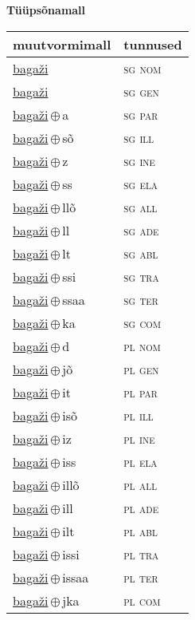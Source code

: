 

\vspace{3.5em}
\noindent \begin{minipage}{\textwidth}
\noindent \textbf{Tüüpsõnamall \,}\\

\begin{sideways}
\begin{tabular}{l l}
muutvormimall & tunnused \\
\hline
\underline{bagaži} & \textsc{ sg nom } \\
\underline{bagaži} & \textsc{ sg gen } \\
\underline{bagaži}\,$\oplus$\,a & \textsc{ sg par } \\
\underline{bagaži}\,$\oplus$\,sõ & \textsc{ sg ill } \\
\underline{bagaži}\,$\oplus$\,z & \textsc{ sg ine } \\
\underline{bagaži}\,$\oplus$\,ss & \textsc{ sg ela } \\
\underline{bagaži}\,$\oplus$\,llõ & \textsc{ sg all } \\
\underline{bagaži}\,$\oplus$\,ll & \textsc{ sg ade } \\
\underline{bagaži}\,$\oplus$\,lt & \textsc{ sg abl } \\
\underline{bagaži}\,$\oplus$\,ssi & \textsc{ sg tra } \\
\underline{bagaži}\,$\oplus$\,ssaa & \textsc{ sg ter } \\
\underline{bagaži}\,$\oplus$\,ka & \textsc{ sg com } \\
\underline{bagaži}\,$\oplus$\,d & \textsc{ pl nom } \\
\underline{bagaži}\,$\oplus$\,jõ & \textsc{ pl gen } \\
\underline{bagaži}\,$\oplus$\,it & \textsc{ pl par } \\
\underline{bagaži}\,$\oplus$\,isõ & \textsc{ pl ill } \\
\underline{bagaži}\,$\oplus$\,iz & \textsc{ pl ine } \\
\underline{bagaži}\,$\oplus$\,iss & \textsc{ pl ela } \\
\underline{bagaži}\,$\oplus$\,illõ & \textsc{ pl all } \\
\underline{bagaži}\,$\oplus$\,ill & \textsc{ pl ade } \\
\underline{bagaži}\,$\oplus$\,ilt & \textsc{ pl abl } \\
\underline{bagaži}\,$\oplus$\,issi & \textsc{ pl tra } \\
\underline{bagaži}\,$\oplus$\,issaa & \textsc{ pl ter } \\
\underline{bagaži}\,$\oplus$\,jka & \textsc{ pl com } \\
\end{tabular}
\end{sideways}
\label{tab:tüüpsõnamall-bagaži}

\end{minipage}

